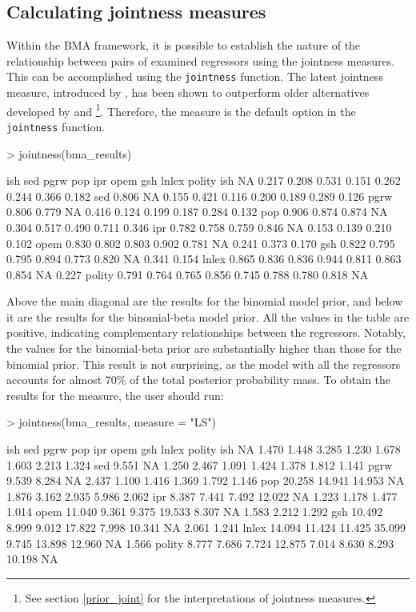 \documentclass[a4paper]{article}
\begin{document}
\subsection{Calculating jointness measures}
Within the BMA framework, it is possible to establish the nature of the relationship between pairs of examined regressors using the jointness measures. This can be accomplished using the \verb+jointness+ function. The latest jointness measure, introduced by \citet{Hofmarcher+2018}, has been shown to outperform older alternatives developed by \citet{Ley+2007} and \citet{Doppelhofer+2009}\footnote{See section \ref{prior_joint} for the interpretations of jointness measures.}. Therefore, the \citet{Hofmarcher+2018} measure is the default option in the \verb+jointness+ function.
\begin{Schunk}
\begin{Sinput}
> jointness(bma_results)
\end{Sinput}
\begin{Soutput}
         ish   sed  pgrw   pop   ipr  opem   gsh lnlex polity
ish       NA 0.217 0.208 0.531 0.151 0.262 0.244 0.366  0.182
sed    0.806    NA 0.155 0.421 0.116 0.200 0.189 0.289  0.126
pgrw   0.806 0.779    NA 0.416 0.124 0.199 0.187 0.284  0.132
pop    0.906 0.874 0.874    NA 0.304 0.517 0.490 0.711  0.346
ipr    0.782 0.758 0.759 0.846    NA 0.153 0.139 0.210  0.102
opem   0.830 0.802 0.803 0.902 0.781    NA 0.241 0.373  0.170
gsh    0.822 0.795 0.795 0.894 0.773 0.820    NA 0.341  0.154
lnlex  0.865 0.836 0.836 0.944 0.811 0.863 0.854    NA  0.227
polity 0.791 0.764 0.765 0.856 0.745 0.788 0.780 0.818     NA
\end{Soutput}
\end{Schunk}
Above the main diagonal are the results for the binomial model prior, and below it are the results for the binomial-beta model prior. All the values in the table are positive, indicating complementary relationships between the regressors. Notably, the values for the binomial-beta prior are substantially higher than those for the binomial prior. This result is not surprising, as the model with all the regressors accounts for almost $70\%$ of the total posterior probability mass. To obtain the results for the \citet{Ley+2007} measure, the user should run:
\begin{Schunk}
\begin{Sinput}
> jointness(bma_results, measure = "LS")
\end{Sinput}
\begin{Soutput}
          ish    sed   pgrw    pop   ipr   opem    gsh  lnlex polity
ish        NA  1.470  1.448  3.285 1.230  1.678  1.603  2.213  1.324
sed     9.551     NA  1.250  2.467 1.091  1.424  1.378  1.812  1.141
pgrw    9.539  8.284     NA  2.437 1.100  1.416  1.369  1.792  1.146
pop    20.258 14.941 14.953     NA 1.876  3.162  2.935  5.986  2.062
ipr     8.387  7.441  7.492 12.022    NA  1.223  1.178  1.477  1.014
opem   11.040  9.361  9.375 19.533 8.307     NA  1.583  2.212  1.292
gsh    10.492  8.999  9.012 17.822 7.998 10.341     NA  2.061  1.241
lnlex  14.094 11.424 11.425 35.099 9.745 13.898 12.960     NA  1.566
polity  8.777  7.686  7.724 12.875 7.014  8.630  8.293 10.198     NA
\end{Soutput}
\end{Schunk}
\end{document}
